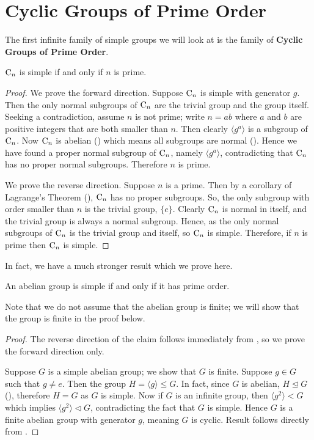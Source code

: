 \section{Cyclic Groups of Prime Order}
The first infinite family of simple groups we will look at is the family of \textbf{Cyclic Groups of Prime Order}.

\begin{lemma}\label{lemma-cyclic-group-simple-iff-order-is-prime}
    $\mathrm{C}_{n}$ is simple if and only if $n$ is prime.
\end{lemma}
\begin{proof}
    We prove the forward direction. Suppose $\mathrm{C}_{n}$ is simple with generator $g$. Then the only normal subgroups of $\mathrm{C}_{n}$ are the trivial group and the group itself. Seeking a contradiction, assume $n$ is not prime; write $n = ab$ where $a$ and $b$ are positive integers that are both smaller than $n$. Then clearly $\langle g^a\rangle$ is a subgroup of $\mathrm{C}_{n}$. Now $\mathrm{C}_{n}$ is abelian () which means all subgroups are normal (). Hence we have found a proper normal subgroup of $\mathrm{C}_{n}$, namely $\langle g^a \rangle$, contradicting that $\mathrm{C}_{n}$ has no proper normal subgroups. Therefore $n$ is prime.
    
    We prove the reverse direction. Suppose $n$ is a prime. Then by a corollary of Lagrange's Theorem (), $\mathrm{C}_{n}$ has no proper subgroups. So, the only subgroup with order smaller than $n$ is the trivial group, $\{e\}$. Clearly $\mathrm{C}_{n}$ is normal in itself, and the trivial group is always a normal subgroup. Hence, as the only normal subgroups of $\mathrm{C}_{n}$ is the trivial group and itself, so $\mathrm{C}_{n}$ is simple. Therefore, if $n$ is prime then $\mathrm{C}_{n}$ is simple.
\end{proof}

In fact, we have a much stronger result which we prove here.
\begin{theorem}\label{thrm-abelian-group-simple-iff-cylic-group-of-prime-order}
    An abelian group is simple if and only if it has prime order.
\end{theorem}
Note that we do not assume that the abelian group is finite; we will show that the group is finite in the proof below.
\begin{proof}
    The reverse direction of the claim follows immediately from , so we prove the forward direction only.
    
    Suppose $G$ is a simple abelian group; we show that $G$ is finite. Suppose $g \in G$ such that $g \neq e$. Then the group $H = \langle g \rangle \leq G$. In fact, since $G$ is abelian, $H \unlhd G$ (), therefore $H = G$ as $G$ is simple. Now if $G$ is an infinite group, then $\langle g^2 \rangle < G$ which implies $\langle g^2 \rangle \lhd G$, contradicting the fact that $G$ is simple. Hence $G$ is a finite abelian group with generator $g$, meaning $G$ is cyclic. Result follows directly from .
\end{proof}

